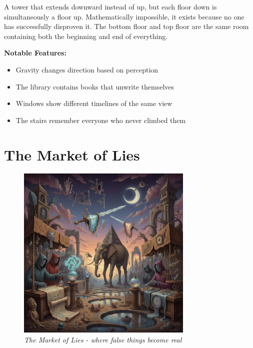 \documentclass[11pt,a4paper,twoside]{book}
\begin{document}
\begin{center}
\end{center}

A tower that extends downward instead of up, but each floor down is simultaneously a floor up. Mathematically impossible, it exists because no one has successfully disproven it. The bottom floor and top floor are the same room containing both the beginning and end of everything.

\textbf{Notable Features:}
\begin{itemize}
    \item Gravity changes direction based on perception
    \item The library contains books that unwrite themselves
    \item Windows show different timelines of the same view
    \item The stairs remember everyone who never climbed them
\end{itemize}

\section{The Market of Lies}

\begin{figure}[h]
\centering
\includegraphics[width=0.75\textwidth]{images/market_of_lies_2025-09-03T22-31-26-965Z_1.png}
\caption*{\textit{The Market of Lies - where false things become real}}
\end{figure}
\end{document}
